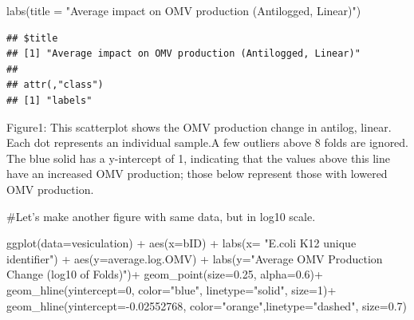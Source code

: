 \documentclass[
]{article}
\newenvironment{Shaded}{\begin{snugshade}}{\end{snugshade}}
\newcommand{\AttributeTok}[1]{\textcolor[rgb]{0.77,0.63,0.00}{#1}}
\newcommand{\DecValTok}[1]{\textcolor[rgb]{0.00,0.00,0.81}{#1}}
\newcommand{\FloatTok}[1]{\textcolor[rgb]{0.00,0.00,0.81}{#1}}
\newcommand{\FunctionTok}[1]{\textcolor[rgb]{0.00,0.00,0.00}{#1}}
\newcommand{\NormalTok}[1]{#1}
\newcommand{\SpecialCharTok}[1]{\textcolor[rgb]{0.00,0.00,0.00}{#1}}
\newcommand{\StringTok}[1]{\textcolor[rgb]{0.31,0.60,0.02}{#1}}
\begin{document}
\begin{Shaded}
\begin{Highlighting}[]
  \FunctionTok{labs}\NormalTok{(}\AttributeTok{title =} \StringTok{"Average impact on OMV production (Antilogged, Linear)"}\NormalTok{)}
\end{Highlighting}
\end{Shaded}

\begin{verbatim}
## $title
## [1] "Average impact on OMV production (Antilogged, Linear)"
## 
## attr(,"class")
## [1] "labels"
\end{verbatim}

Figure1: This scatterplot shows the OMV production change in antilog,
linear. Each dot represents an individual sample.A few outliers above 8
folds are ignored. The blue solid has a y-intercept of 1, indicating
that the values above this line have an increased OMV production; those
below represent those with lowered OMV production.

\#Let's make another figure with same data, but in log10 scale.

\begin{Shaded}
\begin{Highlighting}[]
\FunctionTok{ggplot}\NormalTok{(}\AttributeTok{data=}\NormalTok{vesiculation) }\SpecialCharTok{+}
  \FunctionTok{aes}\NormalTok{(}\AttributeTok{x=}\NormalTok{bID) }\SpecialCharTok{+} 
  \FunctionTok{labs}\NormalTok{(}\AttributeTok{x=} \StringTok{"E.coli K12 unique identifier"}\NormalTok{) }\SpecialCharTok{+}
  \FunctionTok{aes}\NormalTok{(}\AttributeTok{y=}\NormalTok{average.log.OMV) }\SpecialCharTok{+}
  \FunctionTok{labs}\NormalTok{(}\AttributeTok{y=}\StringTok{"Average OMV Production Change (log10 of Folds)"}\NormalTok{)}\SpecialCharTok{+}
  \FunctionTok{geom\_point}\NormalTok{(}\AttributeTok{size=}\FloatTok{0.25}\NormalTok{, }\AttributeTok{alpha=}\FloatTok{0.6}\NormalTok{)}\SpecialCharTok{+}
  \FunctionTok{geom\_hline}\NormalTok{(}\AttributeTok{yintercept=}\DecValTok{0}\NormalTok{, }\AttributeTok{color=}\StringTok{"blue"}\NormalTok{, }\AttributeTok{linetype=}\StringTok{"solid"}\NormalTok{, }\AttributeTok{size=}\DecValTok{1}\NormalTok{)}\SpecialCharTok{+}
  \FunctionTok{geom\_hline}\NormalTok{(}\AttributeTok{yintercept=}\SpecialCharTok{{-}}\FloatTok{0.02552768}\NormalTok{, }\AttributeTok{color=}\StringTok{"orange"}\NormalTok{,}\AttributeTok{linetype=}\StringTok{"dashed"}\NormalTok{, }\AttributeTok{size=}\FloatTok{0.7}\NormalTok{)}
\end{Highlighting}
\end{Shaded}
\end{document}
